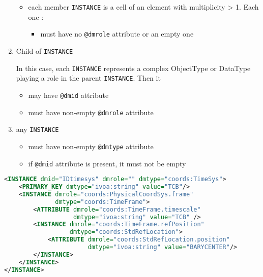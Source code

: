 \begin{enumerate}
\begin{itemize}
     \item each member \texttt{INSTANCE} is a cell of an element with multiplicity > 1.
          Each one :             
           \begin{itemize}
             \item must have no  \texttt{@dmrole} attribute or an empty one
           \end{itemize}
  \end{itemize}  
    
\item Child of \texttt{INSTANCE}

     In this case, each \texttt{INSTANCE} represents 
     a complex ObjectType or DataType playing a role in the parent \texttt{INSTANCE}.
     Then it     
     \begin{itemize}
        \item may have  \texttt{@dmid} attribute
        \item must have non-empty  \texttt{@dmrole} attribute
     \end{itemize}
           
\item any \texttt{INSTANCE}

   \begin{itemize}
   	 \item must have non-empty  \texttt{@dmtype} attribute
	 \item if  \texttt{@dmid} attribute is present, it must not be empty    
    \end{itemize}
\end{enumerate}  
    
   
\begin{lstlisting}[caption={Example of an \texttt{INSTANCE} child of \texttt{INSTANCE} (see line~\ref{INSTANCE_snippet} in Appendix A). It must have a role as a component of the enclosing \texttt{INSTANCE}.},language=XML]
 <INSTANCE dmid="IDtimesys" dmrole="" dmtype="coords:TimeSys">
    <PRIMARY_KEY dmtype="ivoa:string" value="TCB"/>
    <INSTANCE dmrole="coords:PhysicalCoordSys.frame" 
              dmtype="coords:TimeFrame">
        <ATTRIBUTE dmrole="coords:TimeFrame.timescale" 
                   dmtype="ivoa:string" value="TCB" />
        <INSTANCE dmrole="coords:TimeFrame.refPosition" 
                  dmtype="coords:StdRefLocation">
            <ATTRIBUTE dmrole="coords:StdRefLocation.position" 
                       dmtype="ivoa:string" value="BARYCENTER"/>
        </INSTANCE>
    </INSTANCE>
</INSTANCE>
\end{lstlisting}   
   

